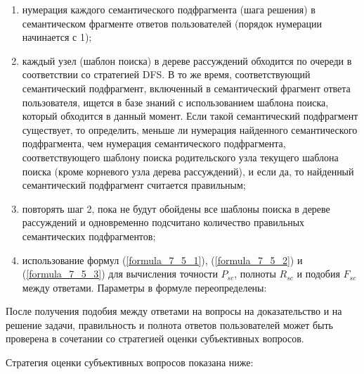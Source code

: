 \begin{enumerate}
	\item нумерация каждого семантического подфрагмента (шага решения) в семантическом фрагменте ответов пользователей (порядок нумерации начинается с 1);
	
	\item каждый узел (шаблон поиска) в дереве рассуждений обходится по очереди в соответствии со стратегией DFS. В то же время, соответствующий семантический подфрагмент, включенный в семантический фрагмент ответа пользователя, ищется в базе знаний с использованием шаблона поиска, который обходится в данный момент. Если такой семантический подфрагмент существует, то определить, меньше ли нумерация найденного семантического подфрагмента, чем нумерация семантического подфрагмента, соответствующего шаблону поиска родительского узла текущего шаблона поиска (кроме корневого узла дерева рассуждений), и если да, то найденный семантический подфрагмент считается правильным;
	
	\item повторять шаг 2, пока не будут обойдены все шаблоны поиска в дереве рассуждений и одновременно подсчитано количество правильных семантических подфрагментов;
	
	\item использование формул (\ref{formula_7_5_1}), (\ref{formula_7_5_2}) и (\ref{formula_7_5_3}) для вычисления точности $P_{sc}$, полноты $R_{sc}$ и подобия $F_{sc}$ между ответами. Параметры в формуле переопределены:
	
	
\end{enumerate}

После получения подобия между ответами на вопросы на доказательство и на решение задачи, правильность и полнота ответов пользователей может быть проверена в сочетании со стратегией оценки субъективных вопросов.

Стратегия оценки субъективных вопросов показана ниже:

